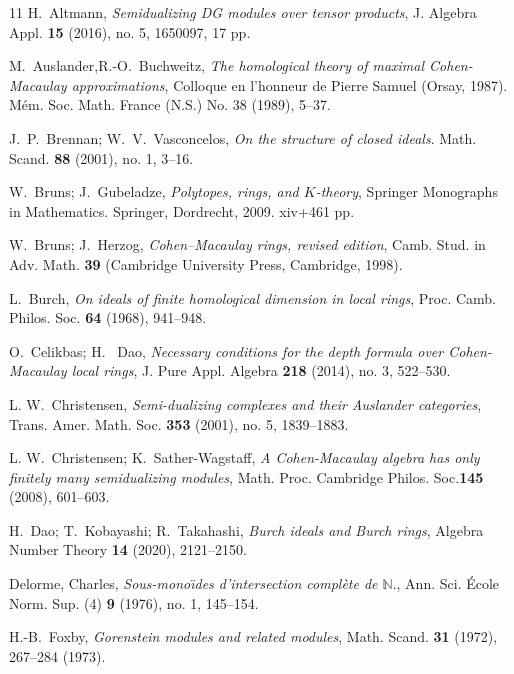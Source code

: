 \documentclass{amsart}
\theoremstyle{plain}
\theoremstyle{definition}
\numberwithin{theorem}{section}
\numberwithin{equation}{section}
\numberwithin{equation}{theorem}
\begin{document}
\begin{thebibliography}{11}
H.~Altmann, \emph{Semidualizing DG modules over tensor products}, J. Algebra Appl. {\bf 15} (2016), no. 5, 1650097, 17 pp. %

M.~Auslander,R.-O.~Buchweitz, \emph{The homological theory of maximal Cohen-Macaulay approximations}, Colloque en l'honneur de Pierre Samuel (Orsay, 1987). M\'em. Soc. Math. France (N.S.) No. 38 (1989), 5--37. %

J.~P.~Brennan; W.~V.~Vasconcelos, \emph{On the structure of closed ideals}. Math. Scand. {\bf 88} (2001), no. 1, 3--16.

W.~Bruns; J.~Gubeladze, \emph{Polytopes, rings, and $K$-theory}, Springer Monographs in Mathematics. Springer, Dordrecht, 2009. xiv+461 pp. %

W.~Bruns; J.~Herzog, \emph{Cohen--Macaulay rings, revised edition}, Camb. Stud. in Adv. Math. {\bf 39}
(Cambridge University Press, Cambridge, 1998).

 L.~Burch, \emph{On ideals of finite homological dimension in local rings}, Proc. Camb. Philos. Soc. {\bf 64} (1968), 941--948. %

 O.~Celikbas; H.~ Dao, \emph{Necessary conditions for the depth formula over Cohen-Macaulay local rings}, J. Pure Appl. Algebra {\bf 218} (2014), no. 3, 522--530. %

 L. W.~Christensen, \emph{Semi-dualizing complexes and their Auslander categories}, Trans. Amer. Math. Soc. {\bf 353} (2001), no. 5, 1839--1883. %

 L. W.~Christensen;  K.~Sather-Wagstaff, \emph{A Cohen-Macaulay algebra has only finitely many semidualizing modules}, Math. Proc. Cambridge Philos. Soc.{\bf 145} (2008), 601--603. %

 H.~Dao; T.~Kobayashi; R.~Takahashi, \emph{Burch ideals and {B}urch rings}, Algebra Number Theory {\bf 14} (2020), 2121--2150.  %

 Delorme, Charles, \emph{Sous-mono\"{\i}des d'intersection compl\`ete de {$\mathbb{N}.$}}, Ann. Sci. \'{E}cole Norm. Sup. (4) {\bf 9} (1976), no. 1, 145--154. %

 H.-B.~Foxby, \emph{Gorenstein modules and related modules}, Math. Scand. {\bf 31} (1972), 267--284 (1973). 


\end{thebibliography}
\end{document}
